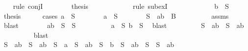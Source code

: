 \begin{isabellebody}
\ {}\ \isamarkupfalse%
\ {\isacharparenleft}rule\ conjI{\isacharparenright}\isanewline
\ \ \ \ \ \ \isamarkupfalse%
\ {\isacharquery}thesis\isanewline
\ \ \ \ \ \ \ \ \isamarkupfalse%
\ {}\ \isamarkupfalse%
\ {\isacharparenleft}rule\ subexI{\isacharparenright}\isanewline
\ \ \ \ \isamarkupfalse%
\isanewline
\ \ \isamarkupfalse%
\isanewline
\ \ \ \ \isamarkupfalse%
\ {\isachardoublequoteopen}b\ {\isasymin}\ S{\isachardoublequoteclose}\isanewline
\ \ \ \ \isamarkupfalse%
\ {\isacharquery}thesis\isanewline
\ \ \ \ \isamarkupfalse%
\ {\isacharparenleft}cases\ {\isachardoublequoteopen}a\ {\isasymin}\ S{\isachardoublequoteclose}{\isacharparenright}\isanewline
\ \ \ \ \ \ \isamarkupfalse%
\ {\isachardoublequoteopen}a\ {\isasymin}\ S{\isachardoublequoteclose}\isanewline
\ \ \ \ \ \ \isamarkupfalse%
\ {}{\isacharcolon}{\isachardoublequoteopen}S\ {\isacharminus}\ {\isacharbraceleft}a{\isacharcomma}b{\isacharbraceright}\ {\isasymsubseteq}\ B{\isachardoublequoteclose}\isanewline
\ \ \ \ \ \ \ \ \isamarkupfalse%
\ assms{\isacharparenleft}{}{\isacharparenright}\ \isamarkupfalse%
\ blast\isanewline
\ \ \ \ \ \ \isamarkupfalse%
\ {\isachardoublequoteopen}{\isacharbraceleft}a{\isacharcomma}b{\isacharbraceright}\ {\isasymunion}\ S\ {\isacharequal}\ S{\isachardoublequoteclose}\isanewline
\ \ \ \ \ \ \ \ \isamarkupfalse%
\ {\isacartoucheopen}a\ {\isasymin}\ S{\isacartoucheclose}\ {\isacartoucheopen}b\ {\isasymin}\ S{\isacartoucheclose}\ \isamarkupfalse%
\ blast\isanewline
\ \ \ \ \ \ \isamarkupfalse%
\ \isamarkupfalse%
\ {\isachardoublequoteopen}S\ {\isacharequal}\ {\isacharbraceleft}a{\isacharcomma}b{\isacharbraceright}\ {\isasymunion}\ {\isacharparenleft}S\ {\isacharminus}\ {\isacharbraceleft}a{\isacharcomma}b{\isacharbraceright}{\isacharparenright}{\isachardoublequoteclose}\ \isanewline
\ \ \ \ \ \ \ \ \isamarkupfalse%
\ blast\isanewline
\ \ \ \ \ \ \isamarkupfalse%
\ \isamarkupfalse%
\ {}{\isacharcolon}{\isachardoublequoteopen}S\ {\isacharequal}\ {\isacharbraceleft}a{\isacharcomma}b{\isacharbraceright}\ {\isasymunion}\ {\isacharparenleft}S\ {\isacharminus}\ {\isacharbraceleft}a{\isacharcomma}b{\isacharbraceright}{\isacharparenright}\ {\isasymor}\ S\ {\isacharequal}\ {\isacharbraceleft}a{\isacharbraceright}\ {\isasymunion}\ {\isacharparenleft}S\ {\isacharminus}\ {\isacharbraceleft}a{\isacharcomma}b{\isacharbraceright}{\isacharparenright}\ {\isasymor}\ S\ {\isacharequal}\ {\isacharbraceleft}b{\isacharbraceright}\ {\isasymunion}\ {\isacharparenleft}S\ {\isacharminus}\ {\isacharbraceleft}a{\isacharcomma}b{\isacharbraceright}{\isacharparenright}\ {\isasymor}\ S\ {\isacharequal}\ {\isacharparenleft}S\ {\isacharminus}\ {\isacharbraceleft}a{\isacharcomma}b{\isacharbraceright}{\isacharparenright}{\isachardoublequoteclose}\isanewline

\end{isabellebody}
